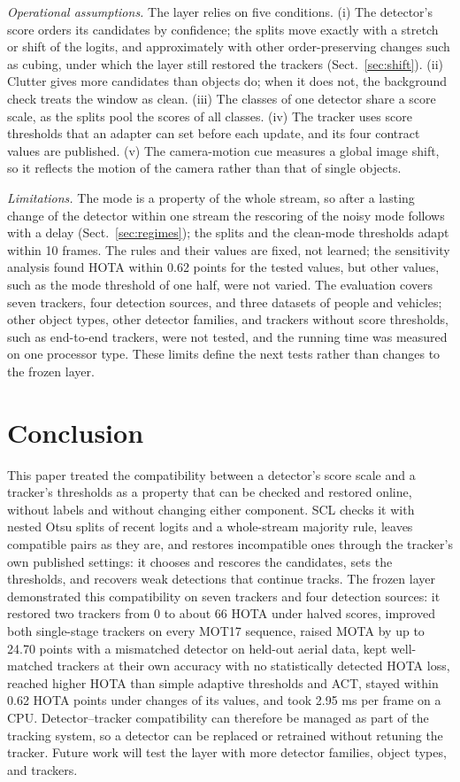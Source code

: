 \documentclass[pdflatex,sn-mathphys-num,iicol]{sn-jnl}
\newcommand{\scl}{SCL}
\begin{document}
\emph{Operational assumptions.} The layer relies on five conditions. (i) The detector's score
orders its candidates by confidence; the splits move exactly with a stretch or shift of the
logits, and approximately with other order-preserving changes such as cubing, under which the
layer still restored the trackers (Sect.~\ref{sec:shift}). (ii) Clutter gives more candidates
than objects do; when it does not, the background check treats the window as clean. (iii) The
classes of one detector share a score scale, as the splits pool the scores of all classes. (iv)
The tracker uses score thresholds that an adapter can set before each update, and its four
contract values are published. (v) The camera-motion cue measures a global image shift, so it
reflects the motion of the camera rather than that of single objects.

\emph{Limitations.} The mode is a property of the whole stream, so after a lasting change of the
detector within one stream the rescoring of the noisy mode follows with a delay
(Sect.~\ref{sec:regimes}); the splits and the clean-mode thresholds adapt within 10 frames. The
rules and their values are fixed, not learned; the sensitivity analysis found HOTA within 0.62
points for the tested values, but other values, such as the mode threshold of one half, were not
varied. The evaluation covers seven trackers, four detection sources, and three datasets of people
and vehicles; other object types, other detector families, and trackers without score thresholds,
such as end-to-end trackers, were not tested, and the running time was measured on one processor
type. These limits define the next tests rather than changes to the frozen layer.
\section{Conclusion}\label{sec:conclusion}

This paper treated the compatibility between a detector's score scale and a tracker's thresholds
as a property that can be checked and restored online, without labels and without changing either
component. \scl{} checks it with nested Otsu splits of recent logits and a whole-stream majority
rule, leaves compatible pairs as they are, and restores incompatible ones through the tracker's own
published settings: it chooses and rescores the candidates, sets the thresholds, and recovers weak
detections that continue tracks. The frozen layer demonstrated this compatibility on seven trackers
and four detection sources: it restored two trackers from 0 to about 66 HOTA under halved scores,
improved both single-stage trackers on every MOT17 sequence, raised MOTA by up to 24.70 points with
a mismatched detector on held-out aerial data, kept well-matched trackers at their own accuracy
with no statistically detected HOTA loss, reached higher HOTA than simple adaptive thresholds and
ACT, stayed within 0.62 HOTA points under changes of its values, and took 2.95 ms per frame on a
CPU. Detector--tracker compatibility can therefore be managed as part of the tracking system, so a
detector can be replaced or retrained without retuning the tracker. Future work will test the layer
with more detector families, object types, and trackers.
\end{document}
